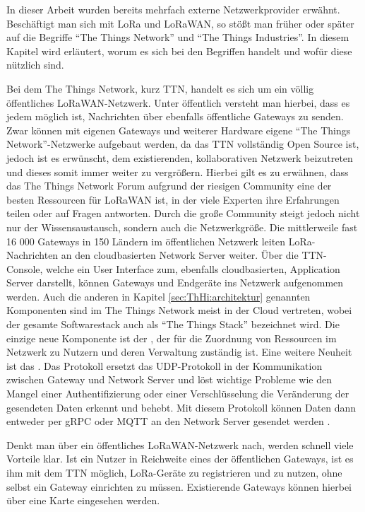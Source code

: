 In dieser Arbeit wurden bereits mehrfach externe Netzwerkprovider erwähnt. Beschäftigt man sich mit LoRa und LoRaWAN, so stößt man früher oder später auf die Begriffe ``The Things Network'' und ``The Things Industries''. In diesem Kapitel wird erläutert, worum es sich bei den Begriffen handelt und wofür diese nützlich sind.

Bei dem The Things Network, kurz TTN, handelt es sich um ein völlig öffentliches LoRaWAN-Netzwerk. Unter öffentlich versteht man hierbei, dass es jedem möglich ist, Nachrichten über ebenfalls öffentliche Gateways zu senden. Zwar können mit eigenen Gateways und weiterer Hardware eigene ``The Things Network''-Netzwerke aufgebaut werden, da das TTN vollständig Open Source ist, jedoch ist es erwünscht, dem existierenden, kollaborativen Netzwerk beizutreten und dieses somit immer weiter zu vergrößern. Hierbei gilt es zu erwähnen, dass das The Things Network Forum aufgrund der riesigen Community eine der besten Ressourcen für LoRaWAN ist, in der viele Experten ihre Erfahrungen teilen oder auf Fragen antworten. Durch die große Community steigt jedoch nicht nur der Wissensaustausch, sondern auch die Netzwerkgröße. Die mittlerweile fast 16 000 Gateways in 150 Ländern im öffentlichen Netzwerk leiten LoRa-Nachrichten an den cloudbasierten Network Server weiter. Über die TTN-Console, welche ein User Interface zum, ebenfalls cloud\-basierten, Application Server darstellt, können Gateways und Endgeräte ins Netzwerk aufgenommen werden. Auch die anderen in Kapitel \ref{sec:ThHi:architektur} genannten Komponenten sind im The Things Network meist in der Cloud vertreten, wobei der gesamte Softwarestack auch als ``The Things Stack'' bezeichnet wird. Die einzige neue Komponente ist der , der für die Zuordnung von Ressourcen im Netzwerk zu Nutzern und deren Verwaltung zuständig ist. Eine weitere Neuheit ist das . Das Protokoll ersetzt das UDP-Protokoll in der Kommunikation zwischen Gateway und Network Server und löst wichtige Probleme wie den Mangel einer Authentifizierung oder einer Verschlüsselung die Veränderung der gesendeten Daten erkennt und behebt. Mit diesem Protokoll können Daten dann entweder per gRPC oder MQTT an den Network Server gesendet werden .

Denkt man über ein öffentliches LoRaWAN-Netzwerk nach, werden schnell viele Vorteile klar. Ist ein Nutzer in Reichweite eines der öffentlichen Gateways, ist es ihm mit dem TTN möglich, LoRa-Geräte zu registrieren und zu nutzen, ohne selbst ein Gateway einrichten zu müssen. Existierende Gateways können hierbei über eine Karte eingesehen werden. 

